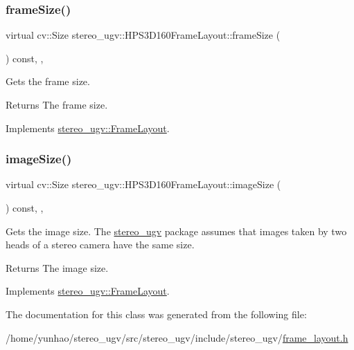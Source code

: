 \subsubsection{\texorpdfstring{frame\+Size()}{frameSize()}}
{\footnotesize\ttfamily virtual cv\+::\+Size stereo\+\_\+ugv\+::\+H\+P\+S3\+D160\+Frame\+Layout\+::frame\+Size (\begin{DoxyParamCaption}{ }\end{DoxyParamCaption}) const\hspace{0.3cm}{\ttfamily [override]}, {\ttfamily [virtual]}, {\ttfamily [noexcept]}}



Gets the frame size. 

\begin{DoxyReturn}{Returns}
The frame size. 
\end{DoxyReturn}


Implements \hyperlink{classstereo__ugv_1_1FrameLayout_a59da4ac9d0cc6a43cccbf8666849bdc2}{stereo\+\_\+ugv\+::\+Frame\+Layout}.

\mbox{\label{classstereo__ugv_1_1HPS3D160FrameLayout_ac98bc2bb7cb4ed0eb28e33b162252832}} 
\subsubsection{\texorpdfstring{image\+Size()}{imageSize()}}
{\footnotesize\ttfamily virtual cv\+::\+Size stereo\+\_\+ugv\+::\+H\+P\+S3\+D160\+Frame\+Layout\+::image\+Size (\begin{DoxyParamCaption}{ }\end{DoxyParamCaption}) const\hspace{0.3cm}{\ttfamily [override]}, {\ttfamily [virtual]}, {\ttfamily [noexcept]}}



Gets the image size. The \hyperlink{namespacestereo__ugv}{stereo\+\_\+ugv} package assumes that images taken by two heads of a stereo camera have the same size. 

\begin{DoxyReturn}{Returns}
The image size. 
\end{DoxyReturn}


Implements \hyperlink{classstereo__ugv_1_1FrameLayout_a12cc36a89f8e66ffc6a2fa5eb3c5f648}{stereo\+\_\+ugv\+::\+Frame\+Layout}.



The documentation for this class was generated from the following file\+:\begin{DoxyCompactItemize}
\item 
/home/yunhao/stereo\+\_\+ugv/src/stereo\+\_\+ugv/include/stereo\+\_\+ugv/\hyperlink{frame__layout_8h}{frame\+\_\+layout.\+h}\end{DoxyCompactItemize}
